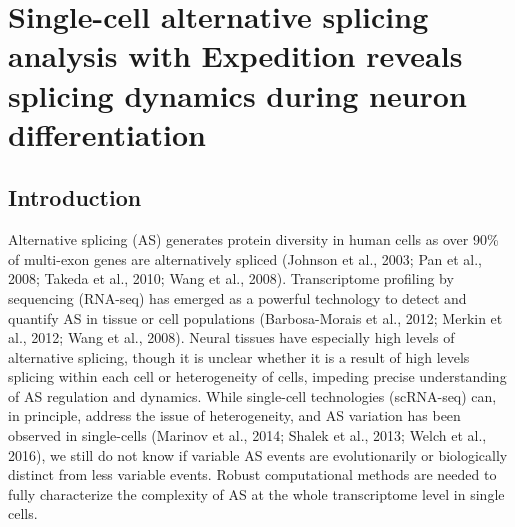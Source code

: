 \chapter{Single-cell alternative splicing analysis with Expedition reveals splicing dynamics during neuron differentiation}


\section{Introduction}
Alternative splicing (AS) generates protein diversity in human cells as over 90\% of multi-exon genes are alternatively spliced (Johnson et al., 2003; Pan et al., 2008; Takeda et al., 2010; Wang et al., 2008). Transcriptome profiling by sequencing (RNA-seq) has emerged as a powerful technology to detect and quantify AS in tissue or cell populations (Barbosa-Morais et al., 2012; Merkin et al., 2012; Wang et al., 2008). Neural tissues have especially high levels of alternative splicing, though it is unclear whether it is a result of high levels splicing within each cell or heterogeneity of cells, impeding precise understanding of AS regulation and dynamics. While single-cell technologies (scRNA-seq) can, in principle, address the issue of heterogeneity, and AS variation has been observed in single-cells (Marinov et al., 2014; Shalek et al., 2013; Welch et al., 2016), we still do not know if variable AS events are evolutionarily or biologically distinct from less variable events. Robust computational methods are needed to fully characterize the complexity of AS at the whole transcriptome level in single cells.
